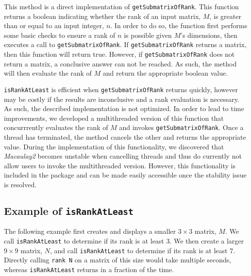 \documentclass[11pt]{amsart}
\begin{document}
This method is a direct implementation of {\tt getSubmatrixOfRank}. This function returns a 
boolean indicating whether the rank of an input matrix, $M$, is greater than or equal to an 
input integer, $n$. In order to do so, the function first performs some basic checks 
to ensure a rank of $n$ is possible given $M$'s dimensions, then executes a call to 
{\tt getSubmatrixOfRank}. If {\tt getSubmatrixOfRank} returns a matrix, then this function 
will return true. However, if {\tt getSubmatrixOfRank} does not return a matrix, a conclusive 
answer can not be reached. As such, the method will then evaluate the rank of $M$ and return 
the appropriate boolean value. 

\par {\tt isRankAtLeast} is efficient when {\tt getSubmatrixOfRank} returns quickly, however may be 
costly if the results are inconclusive and a rank evaluation is necessary. As such, the 
described implementation is not optimized. In order to lead to time improvements, we developed a 
multithreaded version of this function that concurrrently evaluates the rank of $M$ and invokes 
{\tt getSubmatrixOfRank}. Once a thread has terminated, the method cancels the other and returns 
the appropriate value. During the implementation of this functionality, we discovered that 
\emph{Macaulay2} becomes unstable when cancelling threads and thus do currently not allow users 
to invoke the multithreaded version. However, this functionality is included in the package and can 
be made easily accessible once the stability issue is resolved. 

\subsection{Example of {\tt isRankAtLeast}}
The following example first creates and displays a smaller $3 \times 3$ matrix, $M$. We call
{\tt isRankAtLeast} to determine if its rank is at least 3. We then create a larger $9 \times 9$ 
matrix, $N$, and call {\tt isRankAtLeast} to determine if its rank is at least 7. Directly calling 
{\tt rank N} on a matrix of this size would take multiple seconds, whereas {\tt isRankAtLeast} 
returns in a fraction of the time. 
\end{document}
